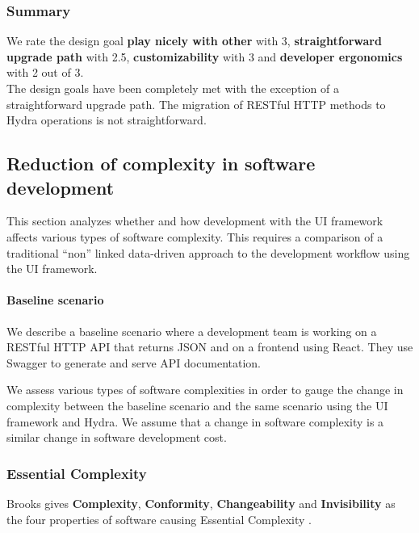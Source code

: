 \subsubsection{Summary}
We rate the design goal \textbf{play nicely with other} with 3, \textbf{straightforward upgrade path} with 2.5, \textbf{customizability} with 3 and \textbf{developer ergonomics} with 2 out of 3. \\ The design goals have been completely met with the exception of a straightforward upgrade path. The migration of RESTful HTTP methods to Hydra operations is not straightforward.

\subsection{Reduction of complexity in software development}
This section analyzes whether and how development with the UI framework affects various types of software complexity. This requires a comparison of a traditional ``non'' linked data-driven approach to the development workflow using the UI framework.

\paragraph{Baseline scenario} We describe a baseline scenario where a development team is working on a RESTful HTTP API that returns JSON and on a frontend using React. They use Swagger to generate and serve API documentation.

We assess various types of software complexities in order to gauge the change in complexity between the baseline scenario and the same scenario using the UI framework and Hydra. We assume that a change in software complexity is a similar change in software development cost.

\subsubsection{Essential Complexity}
Brooks gives \textbf{Complexity}, \textbf{Conformity}, \textbf{Changeability} and \textbf{Invisibility} as the four properties of software causing Essential Complexity \citep{nosilverbullet}.

